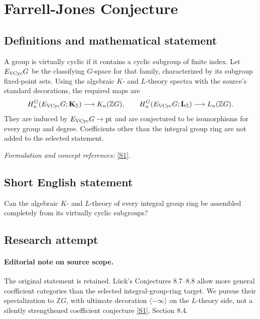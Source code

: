 \documentclass[11pt,a4paper]{article}
\newcommand{\Z}{\mathbb{Z}}
\newcommand{\sref}[2]{\hyperlink{source:#1:#2}{[S#2]}}
\newif\ifshowcatalogue
\newcommand{\cataloguescope}[1]{\ifshowcatalogue
 \paragraph{Exact scope in the supplied catalogue.}
 \begin{quote}\small #1\end{quote}\fi}
\numberwithin{equation}{section}
\begin{document}
\setcounter{section}{0}
\clearpage
\section*{\texorpdfstring{Farrell-Jones Conjecture}{Farrell-Jones Conjecture}}\label{1452}
\subsection{Definitions and mathematical statement}
A group is virtually cyclic if it contains a cyclic subgroup of finite index. Let $E_{\rm VCyc}G$ be the classifying $G$-space for that family, characterized by its subgroup fixed-point sets. Using the algebraic $K$- and $L$-theory spectra with the source's standard decorations, the required maps are
\[
 H_n^G(E_{\rm VCyc}G;\mathbf K_{\Z})\longrightarrow K_n(\Z G),\qquad
 H_n^G(E_{\rm VCyc}G;\mathbf L_{\Z})\longrightarrow L_n(\Z G).
\]
They are induced by $E_{\rm VCyc}G\to\mathrm{pt}$ and are conjectured to be isomorphisms for every group and degree. Coefficients other than the integral group ring are not added to the selected statement.
\par\smallskip\textit{Formulation and concept references:} \sref{1452}{1}.
\cataloguescope{Prove the Farrell-Jones conjecture for every group G: the assembly maps from the equivariant homology of the classifying space for the family of virtually cyclic subgroups to the algebraic K-theory, respectively L-theory, of the group ring \ensuremath{\mathbb Z}G are isomorphisms.}
\subsection{Short English statement}
Can the algebraic $K$- and $L$-theory of every integral group ring be assembled completely from its virtually cyclic subgroups?
\subsection{Research attempt}

\paragraph{Editorial note on source scope.}
The original statement is retained. Lück's Conjectures 8.7--8.8 allow more general coefficient categories than the selected integral-group-ring target. We pursue their specialization to $\Z G$, with ultimate decoration $\langle-\infty\rangle$ on the $L$-theory side, not a silently strengthened coefficient conjecture \sref{1452}{1}, Section 8.4.
\end{document}

